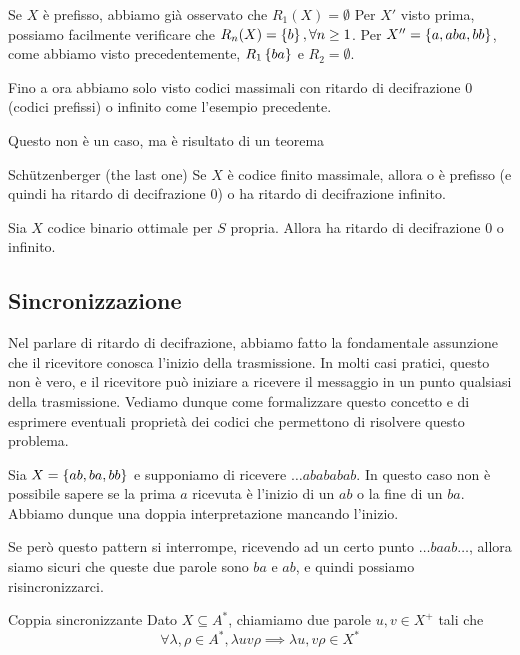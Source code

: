 \begin{example}{}
  Se \(X\) è prefisso, abbiamo già osservato che \(R_1(X) = \emptyset\)
  Per \(X'\) visto prima, possiamo facilmente verificare che \(R_n(X) = \set{b}, \forall n \geq 1\).
  Per \(X'' = \set{a,aba,bb}\), come abbiamo visto precedentemente, \(R_1\set{ba}\) e \(R_2 = \emptyset\).
\end{example}

Fino a ora abbiamo solo visto codici massimali con ritardo di decifrazione \(0\) (codici prefissi) o infinito come l'esempio precedente.

Questo non è un caso, ma è risultato di un teorema

\begin{theorem}{Schützenberger (the last one)}
  Se \(X\) è codice finito massimale, allora o è prefisso (e quindi ha ritardo di decifrazione \(0\)) o ha ritardo di decifrazione infinito.
\end{theorem}

\begin{corollary}{}
  Sia \(X\) codice binario ottimale per \(S\) propria. Allora ha ritardo di decifrazione \(0\) o infinito.
\end{corollary}

\subsection{Sincronizzazione}

Nel parlare di ritardo di decifrazione, abbiamo fatto la fondamentale assunzione che il ricevitore conosca l'inizio della trasmissione.
In molti casi pratici, questo non è vero, e il ricevitore può iniziare a ricevere il messaggio in un punto qualsiasi della trasmissione.
Vediamo dunque come formalizzare questo concetto e di esprimere eventuali proprietà dei codici che permettono di risolvere questo problema.

Sia \(X = \set{ab,ba,bb}\) e supponiamo di ricevere \(\ldots abababab\). 
In questo caso non è possibile sapere se la prima \(a\) ricevuta è l'inizio di un \(ab\) o la fine di un \(ba\).
Abbiamo dunque una doppia interpretazione mancando l'inizio.

Se però questo pattern si interrompe, ricevendo ad un certo punto \(\ldots baab \ldots\), allora siamo sicuri che queste due parole sono \(ba\) e \(ab\), e quindi possiamo risincronizzarci.

\begin{definition}{Coppia sincronizzante}
  Dato \(X\subseteq A^*\), chiamiamo  due parole \(u,v \in X^+\) tali che
  \[\forall \lambda,\rho \in A^*, \lambda u v \rho \implies \lambda u, v\rho \in X^*\]
\end{definition}

